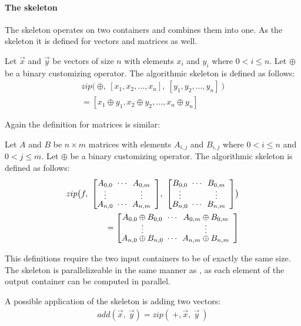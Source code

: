 \paragraph{The \zip skeleton}
The \zip skeleton operates on two containers and combines them into one.
As the \map skeleton it is defined for vectors and matrices as well.
\begin{definition}
  \label{definition:zip}
  Let $\vec{x}$ and $\vec{y}$ be vectors of size $n$ with elements $x_i$ and $y_i$ where $0 < i \leq n$.
  Let $\oplus$ be a binary customizing operator.
  The algorithmic skeleton \zip is defined as follows:
  \begin{equation}
    \begin{split}
    zip \big(\ \oplus,\ [x_1, x_2, \dots, x_n],\ [y_1, y_2, \dots, y_n]\ \big)\\
      = [x_1 \oplus y_1, x_2 \oplus y_2, \dots, x_n \oplus y_n]
    \end{split}
  \end{equation}
\end{definition}
\noindent
Again the definition for matrices is similar:
\begin{definition}
  \label{definition:zip:matrix}
  Let $A$ and $B$ be $n\times m$ matrices with elements $A_{i,j}$ and $B_{i,j}$ where $0 < i \leq n$ and $0 < j \leq m$.
  Let $\oplus$ be a binary customizing operator.
  The algorithmic skeleton \zip is defined as follows:
  \begin{equation}
    \begin{split}
    zip\big( f,\ {\DottedMatrix{A_{0,0}}{A_{0,m}}{A_{n,0}}{A_{n,m}}},\
                 {\DottedMatrix{B_{0,0}}{B_{0,m}}{B_{n,0}}{B_{n,m}}}\big) \\
      = \DottedMatrix{A_{0,0} \oplus B_{0,0}}{A_{0,m} \oplus B_{0,m}}{A_{n,0} \oplus B_{n,0}}{A_{n,m} \oplus B_{n,m}}
    \end{split}
  \end{equation}
\end{definition}
\noindent
This definitions require the two input containers to be of exactly the same size.
The \zip skeleton is parallelizeable in the same manner as \map, as each element of the output container can be computed in parallel.

A possible application of the \zip skeleton is adding two vectors:
\begin{align*}
  add(\vec{x},\ \vec{y}) = zip(\ +, \vec{x},\ \vec{y}\ )
\end{align*}


